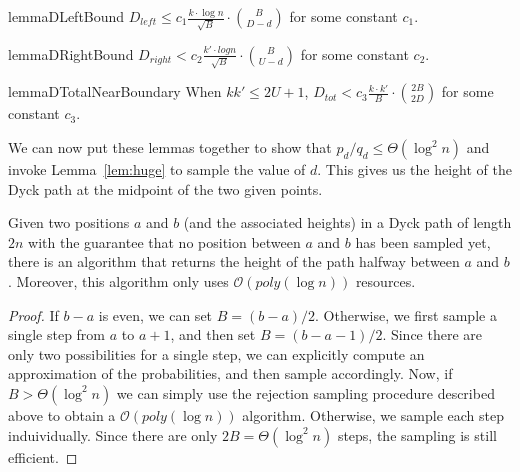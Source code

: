 \begin{restatable}{lemma}{DLeftBound}
\label{lem:DLeftBound}
$D_{left} \le c_1 \frac{ k\cdot\log n}{\sqrt{B}}\cdot{{B}\choose{D-d}}$ for some constant $c_1$.
\end{restatable}

\begin{restatable}{lemma}{DRightBound}
\label{lem:DRightBound}
$D_{right} < c_2 \frac{k'\cdot log n}{\sqrt{B}}\cdot{{B}\choose{U-d}}$ for some constant $c_2$.
\end{restatable}

\begin{restatable}{lemma}{DTotalNearBoundary}
\label{lem:DTotalNearBoundary}
When $kk' \le 2U + 1$, $D_{tot} < c_3 \frac{k\cdot k'}{B}\cdot{{2B}\choose{2D}}$ for some constant $c_3$.
\end{restatable}

We can now put these lemmas together to show that $p_d/q_d \le \Theta(\log^2 n)$ and invoke Lemma~\ref{lem:huge} to sample the value of $d$.
This gives us the height of the Dyck path at the midpoint of the two given points.

\begin{theorem}
\label{thm:dyck_midpoint_sampling}
Given two positions $a$ and $b$ (and the associated heights) in a Dyck path of length $2n$
with the guarantee that no position between $a$ and $b$ has been sampled yet,
there is an algorithm that returns the height of the path halfway between $a$ and $b$.
Moreover, this algorithm only uses $\mathcal O(poly(\log n))$ resources.
\end{theorem}
\begin{proof}
If $b-a$ is even, we can set $B = (b-a)/2$.
Otherwise, we first sample a single step from $a$ to $a+1$, and then set $B = (b-a-1)/2$.
Since there are only two possibilities for a single step,
we can explicitly compute an approximation of the probabilities, and then sample accordingly.
Now, if $B > \Theta(\log^2 n)$ we can simply use the rejection sampling procedure described above
to obtain a $\mathcal O(poly(\log n))$ algorithm.
Otherwise, we sample each step induividually.
Since there are only $2B = \Theta(\log^2 n)$ steps, the sampling is still efficient.
\end{proof}

